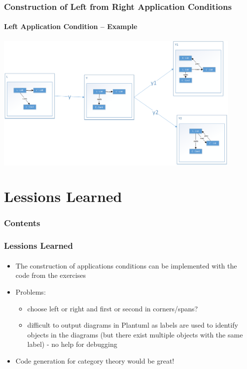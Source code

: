 \documentclass[32pt,t]{beamer}
\begin{document}
	\begin{frame}
		\frametitle{Construction of Left from Right Application Conditions}
		\framesubtitle{Left Application Condition -- Example}
		\centering
		\includegraphics[width=12cm]{Images/60_Result-LeftAC}
	\end{frame}

\section{Lessions Learned}
	\begin{frame}
		\frametitle{Contents}
		\tableofcontents[currentsection]
	\end{frame}
	
	\begin{frame}
		\frametitle{Lessions Learned}
		\framesubtitle{}
		\begin{itemize}
			\item The construction of applications conditions can be implemented with the code from the exercises
			\item Problems:
				\begin{itemize}
					\item choose left or right and first or second in corners/spans?
					\item difficult to output diagrams in Plantuml as labels are used to identify objects in the diagrams (but there exist multiple objects with the same label) - no help for debugging  
				\end{itemize}
			\item Code generation for category theory would be great!
		\end{itemize}
	\end{frame}		
	
\end{document}
